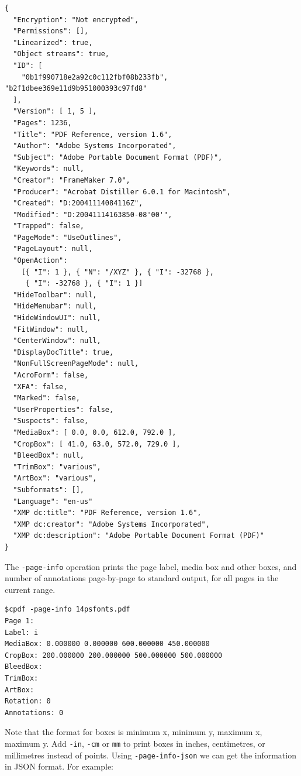 \documentclass{book}
\begin{document}
\begin{framed}
{\small\begin{verbatim}
{
  "Encryption": "Not encrypted",
  "Permissions": [],
  "Linearized": true,
  "Object streams": true,
  "ID": [
    "0b1f990718e2a92c0c112fbf08b233fb", "b2f1dbee369e11d9b951000393c97fd8"
  ],
  "Version": [ 1, 5 ],
  "Pages": 1236,
  "Title": "PDF Reference, version 1.6",
  "Author": "Adobe Systems Incorporated",
  "Subject": "Adobe Portable Document Format (PDF)",
  "Keywords": null,
  "Creator": "FrameMaker 7.0",
  "Producer": "Acrobat Distiller 6.0.1 for Macintosh",
  "Created": "D:20041114084116Z",
  "Modified": "D:20041114163850-08'00'",
  "Trapped": false,
  "PageMode": "UseOutlines",
  "PageLayout": null,
  "OpenAction":
    [{ "I": 1 }, { "N": "/XYZ" }, { "I": -32768 },
     { "I": -32768 }, { "I": 1 }]
  "HideToolbar": null,
  "HideMenubar": null,
  "HideWindowUI": null,
  "FitWindow": null,
  "CenterWindow": null,
  "DisplayDocTitle": true,
  "NonFullScreenPageMode": null,
  "AcroForm": false,
  "XFA": false,
  "Marked": false,
  "UserProperties": false,
  "Suspects": false,
  "MediaBox": [ 0.0, 0.0, 612.0, 792.0 ],
  "CropBox": [ 41.0, 63.0, 572.0, 729.0 ],
  "BleedBox": null,
  "TrimBox": "various",
  "ArtBox": "various",
  "Subformats": [],
  "Language": "en-us"
  "XMP dc:title": "PDF Reference, version 1.6",
  "XMP dc:creator": "Adobe Systems Incorporated",
  "XMP dc:description": "Adobe Portable Document Format (PDF)"
}
\end{verbatim}}\end{framed}

\noindent The \texttt{-page-info} operation prints the page label, media box and other boxes, and number of annotations page-by-page to standard output, for all pages in the current range.

\begin{framed}
{\small\begin{verbatim}
$cpdf -page-info 14psfonts.pdf
Page 1:
Label: i
MediaBox: 0.000000 0.000000 600.000000 450.000000
CropBox: 200.000000 200.000000 500.000000 500.000000
BleedBox: 
TrimBox: 
ArtBox:
Rotation: 0
Annotations: 0
\end{verbatim}}
\end{framed}

\noindent Note that the format for boxes is minimum x, minimum y, maximum x, maximum y. Add \texttt{-in}, \texttt{-cm} or \texttt{mm} to print boxes in inches, centimetres, or millimetres instead of points. Using \texttt{-page-info-json} we can get the information in JSON format. For example:
\end{document}
